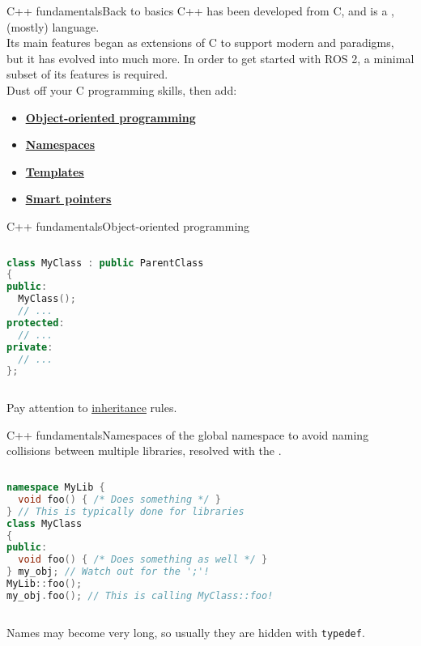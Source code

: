 \begin{frame}{C++ fundamentals}{Back to basics}
	C++ has been developed from C, and is a ,  (mostly) language.\\
	Its main features began as extensions of C to support modern  and  paradigms, but it has evolved into much more.
	\newline\newline
	In order to get started with ROS 2, a minimal subset of its features is required.\\
	Dust off your C programming skills, then add:
	\begin{itemize}
		\item \href{https://www.geeksforgeeks.org/c-classes-and-objects/}{\color{blue}\underline{\textbf{Object-oriented programming}}}
		\item \href{https://www.geeksforgeeks.org/namespace-in-c/}{\color{blue}\underline{\textbf{Namespaces}}}
		\item \href{https://www.geeksforgeeks.org/templates-cpp/}{\color{blue}\underline{\textbf{Templates}}}
		\item \href{https://www.geeksforgeeks.org/smart-pointers-cpp/}{\color{blue}\underline{\textbf{Smart pointers}}}
	\end{itemize}
\end{frame}
\begin{frame}[fragile]{C++ fundamentals}{Object-oriented programming}
	\begin{columns}
		\begin{lstlisting}[language=C++, caption=Example of definition of a C++ class.]
class MyClass : public ParentClass
{
public:
  MyClass();
  // ...
protected:
  // ...
private:
  // ...
};\end{lstlisting}
	\end{columns}
	Pay attention to \href{https://www.geeksforgeeks.org/inheritance-in-c/}{\color{blue}\underline{inheritance}} rules.
\end{frame}
\begin{frame}[fragile]{C++ fundamentals}{Namespaces}
	 of the global namespace to avoid naming collisions between multiple libraries, resolved with the \textbg{\texttt{::} operator}.
	\begin{columns}
		\column{.9\textwidth}
		\begin{lstlisting}[language=C++, caption=Example of namespaces usage.]
namespace MyLib {
  void foo() { /* Does something */ }
} // This is typically done for libraries
class MyClass
{
public:
  void foo() { /* Does something as well */ }
} my_obj; // Watch out for the ';'!
MyLib::foo();
my_obj.foo(); // This is calling MyClass::foo!\end{lstlisting}
	\end{columns}
	Names may become very long, so usually they are hidden with \texttt{typedef}.
\end{frame}
